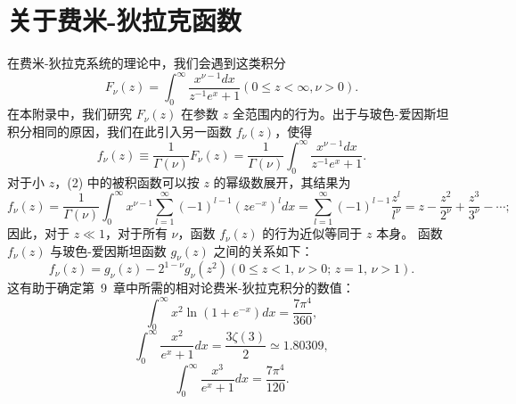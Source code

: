 \section{关于费米-狄拉克函数}\label{e-ux5173ux4e8eux8d39ux7c73-ux72c4ux62c9ux514bux51fdux6570}
在费米-狄拉克系统的理论中，我们会遇到这类积分
\begin{equation}\tag{17.5.1}\label{eq:17.5.1}
F _ { \nu } ( z ) = \int _ { 0 } ^{\infty} \frac { x ^{\nu - 1} d x } { z ^{- 1} e ^{x} + 1 }  ( 0 \leq z < \infty , \nu > 0 ) .
\end{equation}
在本附录中，我们研究 \(F_{\nu}(z)\) 在参数 \(z\) 全范围内的行为。出于与玻色-爱因斯坦积分相同的原因，我们在此引入另一函数 \(f_{\nu}(z)\)，使得
\begin{equation}\tag{17.5.2}\label{eq:17.5.2}
f _ { \nu } ( z ) \equiv \frac { 1 } { \Gamma ( \nu ) } F _ { \nu } ( z ) = \frac { 1 } { \Gamma ( \nu ) } \int _ { 0 } ^{\infty} \frac { x ^{\nu - 1} d x } { z ^{- 1} e ^{x} + 1 } .
\end{equation}
对于小 \(z\)，(2) 中的被积函数可以按 \(z\) 的幂级数展开，其结果为
\begin{equation}\tag{17.5.3}\label{eq:17.5.3}
f _ { \nu } ( z ) = \frac { 1 } { \Gamma ( \nu ) } \int _ { 0 } ^{\infty} x ^{\nu - 1} \sum _ { l = 1 } ^{\infty} ( - 1 ) ^{l - 1} ( z e ^{- x} ) ^{l} d x = \sum _ { l = 1 } ^{\infty} ( - 1 ) ^{l - 1} \frac { z ^{l} } { l ^{\nu} } = z - \frac { z ^{2} } { 2 ^{\nu} } + \frac { z ^{3} } { 3 ^{\nu} } - \cdots ;
\end{equation}
因此，对于 \(z \ll 1\)，对于所有 \(\nu\)，函数 \(f_{\nu}(z)\) 的行为近似等同于 \(z\) 本身。
函数 \(f_{\nu}(z)\) 与玻色-爱因斯坦函数 \(g_{\nu}(z)\) 之间的关系如下：
\begin{equation}\tag{17.5.4}\label{eq:17.5.4}
f _ { \nu } ( z ) = g _ { \nu } ( z ) - 2 ^{1 - \nu} g _ { \nu } ( z ^{2} )  ( 0 \leq z < 1 , \, \nu > 0 ; \, z = 1 , \, \nu > 1 ) .
\end{equation}
这有助于确定第~9~章中所需的相对论费米-狄拉克积分的数值：
\begin{equation}\tag{17.5.5}\label{eq:17.5.5}
\int _ { 0 } ^{\infty} x ^{2} \ln ( 1 + e ^{- x} ) d x = { \frac { 7 \pi ^{4} } { 36 0 } } ,
\end{equation}
\begin{equation}\tag{17.5.6}\label{eq:17.5.6}
\int _ { 0 } ^{\infty} \frac { x ^{2} } { e ^{x} + 1 } d x = \frac { 3 \zeta ( 3 ) } { 2 } \simeq 1 . 80 30 9 ,
\end{equation}
\begin{equation}\tag{17.5.7}\label{eq:17.5.7}
\int _ { 0 } ^{\infty} { \frac { x ^{3} } { e ^{x} + 1 } } d x = { \frac { 7 \pi ^{4} } { 12 0 } } .
\end{equation}
